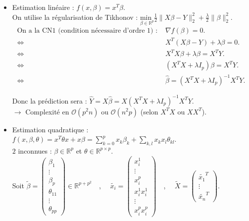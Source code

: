 \documentclass[12pt,a4paper]{article}
\begin{document}
\begin{itemize}
    \item Estimation linéaire : $f(x, \beta) = x^T \beta$.\\
    On utilise la régularisation de Tikhonov : $\underset{\beta \in \mathbb{R}^p}{\text{min }} \frac{1}{2} \lVert X\beta - Y \rVert^2_2 + \frac{\lambda}{2} \lVert \beta \rVert^2_2$.
    \begin{align*}
        \text{On a la CN1 (condition nécessaire d'ordre 1) : } &\nabla f(\beta) = 0. \\
        \Leftrightarrow &X^T(X\beta - Y) + \lambda \beta = 0. \\
        \Leftrightarrow &X^TX\beta + \lambda \beta = X^TY. \\
        \Leftrightarrow &(X^TX + \lambda I_p)\beta = X^TY. \\
        \Leftrightarrow &\hat{\beta} = (X^TX + \lambda I_p)^{-1}X^TY.
    \end{align*}

    Donc la prédiction sera : $\hat{Y} = X\hat{\beta} = X(X^TX + \lambda I_p)^{-1}X^TY$. \\
    $\rightarrow$ Complexité en $\mathcal{O}(p^2n)$ ou $\mathcal{O}(n^2p)$ (selon $X^TX$ ou $XX^T$).\\

    \item Estimation quadratique : $f(x, \beta, \theta) = x^T \theta x + x \beta = \sum_{k=0}^p x_k \beta_k + \sum_{k, l} x_k x_l \theta_{kl}$. \\
    $2$ inconnues : $\beta \in \mathbb{R}^p$ et $\theta \in \mathbb{R}^{p \times p}$. \\

    Soit $\tilde{\beta} = \begin{pmatrix}
        \beta_1 \\
        \vdots \\
        \beta_p \\
        \theta_{11} \\
        \vdots \\
        \theta_{pp}
        \end{pmatrix} \in \mathbb{R}^{p + p^2} \quad$,
        $\quad \tilde{x_i} = \begin{pmatrix}
            x_i^1 \\
            \vdots \\
            x_i^p \\
            x_i^1 x_i^1 \\
            \vdots \\
            x_i^p x_i^p
        \end{pmatrix} \quad$,
        $\quad \tilde{X} = \begin{pmatrix}
            \tilde{x_1}^T \\
            \vdots \\
            \tilde{x_n}^T
        \end{pmatrix}$. \\


\end{itemize}
\end{document}
